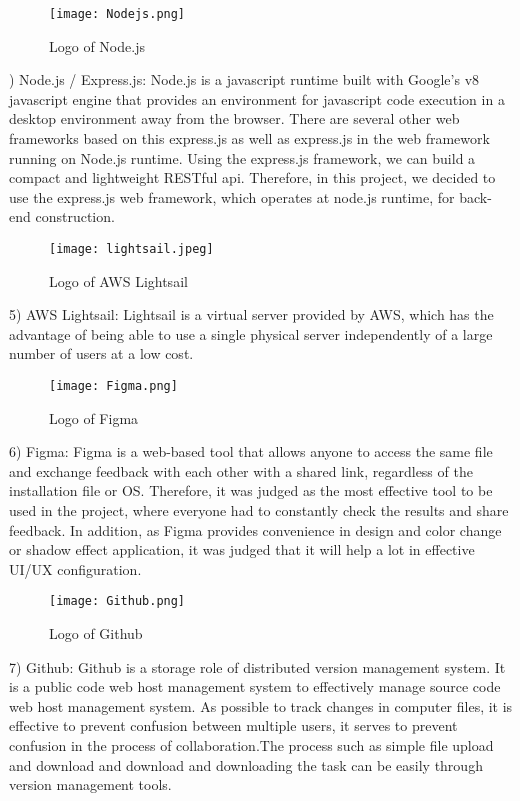 \documentclass[conference]{IEEEtran}
\begin{document}
\begin{figure}[htbp]
\centerline{\texttt{[image: Nodejs.png]}}
\label{fig}
\caption{Logo of Node.js}
\end{figure}
) Node.js / Express.js: Node.js is a javascript runtime built with Google's v8 javascript engine that provides an environment for javascript code execution in a desktop environment away from the browser. There are several other web frameworks based on this express.js as well as express.js in the web framework running on Node.js runtime. Using the express.js framework, we can build a compact and lightweight RESTful api. Therefore, in this project, we decided to use the express.js web framework, which operates at node.js runtime, for back-end construction.\\

\begin{figure}[htbp]
\centerline{\texttt{[image: lightsail.jpeg]}}
\label{fig}
\caption{Logo of AWS Lightsail}
\end{figure}
5) AWS Lightsail: Lightsail is a virtual server provided by AWS, which has the advantage of being able to use a single physical server independently of a large number of users at a low cost.\\

\begin{figure}[htbp]
\centerline{\texttt{[image: Figma.png]}}
\label{fig}
\caption{Logo of Figma}
\end{figure}
6) Figma: Figma is a web-based tool that allows anyone to access the same file and exchange feedback with each other with a shared link, regardless of the installation file or OS. Therefore, it was judged as the most effective tool to be used in the project, where everyone had to constantly check the results and share feedback. In addition, as Figma provides convenience in design and color change or shadow effect application, it was judged that it will help a lot in effective UI/UX configuration.\\

\newpage
\begin{figure}[htbp]
\centerline{\texttt{[image: Github.png]}}
\label{fig}
\caption{Logo of Github}
\end{figure}
7) Github: Github is a storage role of distributed version management system. It is a public code web host management system to effectively manage source code web host management system.
As possible to track changes in computer files, it is effective to prevent confusion between multiple users, it serves to prevent confusion in the process of collaboration.The process such as simple file upload and download and download and downloading the task can be easily through version management tools.\\
\end{document}
